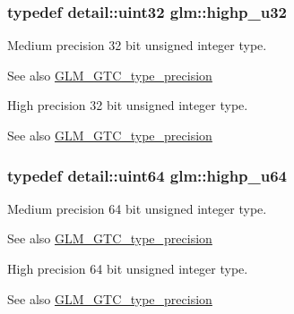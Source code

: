 \subsubsection[{highp\+\_\+u32}]{\setlength{\rightskip}{0pt plus 5cm}typedef {\bf detail\+::uint32} {\bf glm\+::highp\+\_\+u32}}\label{group__gtc__type__precision_gae8e8a2c712653891a03c171795286ac5}
Medium precision 32 bit unsigned integer type. \begin{DoxySeeAlso}{See also}
\hyperlink{group__gtc__type__precision}{G\+L\+M\+\_\+\+G\+T\+C\+\_\+type\+\_\+precision}
\end{DoxySeeAlso}
High precision 32 bit unsigned integer type. \begin{DoxySeeAlso}{See also}
\hyperlink{group__gtc__type__precision}{G\+L\+M\+\_\+\+G\+T\+C\+\_\+type\+\_\+precision} 
\end{DoxySeeAlso}
\hypertarget{group__gtc__type__precision_ga6006ea883d3c0491791650b2fb84de39}{}
\subsubsection[{highp\+\_\+u64}]{\setlength{\rightskip}{0pt plus 5cm}typedef detail\+::uint64 {\bf glm\+::highp\+\_\+u64}}\label{group__gtc__type__precision_ga6006ea883d3c0491791650b2fb84de39}
Medium precision 64 bit unsigned integer type. \begin{DoxySeeAlso}{See also}
\hyperlink{group__gtc__type__precision}{G\+L\+M\+\_\+\+G\+T\+C\+\_\+type\+\_\+precision}
\end{DoxySeeAlso}
High precision 64 bit unsigned integer type. \begin{DoxySeeAlso}{See also}
\hyperlink{group__gtc__type__precision}{G\+L\+M\+\_\+\+G\+T\+C\+\_\+type\+\_\+precision} 
\end{DoxySeeAlso}
\hypertarget{group__gtc__type__precision_ga8a60abe782749c504fb5ae51eb8b49cc}{}
